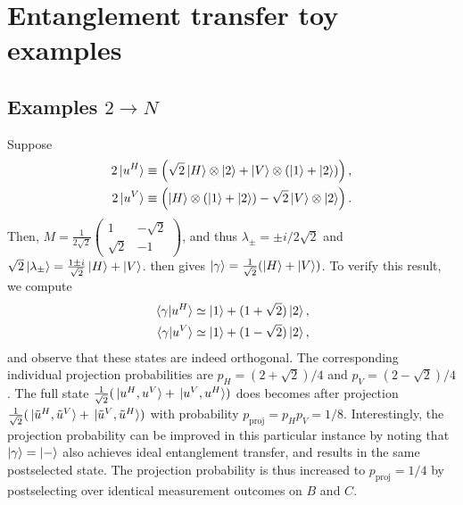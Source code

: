 \documentclass[
aps, pra, authorblock, superscriptaddress, twocolumn,
	10pt]{revtex4-1}
\newcommand{\on}[1]{\operatorname{#1}}
\newcommand{\parTitle}[1]{\noindent{\color{Mahogany}(\emph{#1})}}
\begin{document}
\section{Entanglement transfer toy examples}

\subsection{Examples \texorpdfstring{$2\to N$}{2->N}}
\parTitle{Example 1}
Suppose
\begin{equation}
\begin{aligned}
    2\ket*{u^H} \equiv \left(
        \sqrt2\ket H \otimes\ket2 +
        \ket V \otimes(\ket1 + \ket2)
    \right), \\
    2\ket*{u^V} \equiv \left(
        \ket H\otimes(\ket1 + \ket2) -
        \sqrt2\ket V\otimes \ket2
    \right).
\end{aligned}
\end{equation}
Then,
$M = \frac{1}{2\sqrt2}\begin{pmatrix}1 & -\sqrt2 \\ \sqrt2 & -1 \end{pmatrix}$,
and thus $\lambda_\pm=\pm i/2\sqrt2$ and
$\sqrt2\ket{\lambda_\pm}=\frac{1\pm i}{\sqrt2}\ket H + \ket V$.
 then gives
$\ket\gamma=\frac{1}{\sqrt2}(\ket H + \ket V)$.
To verify this result, we compute
\begin{equation}
\begin{aligned}
    \braket*{\gamma}{u^H} \simeq %
        \ket1 + (1+\sqrt2)\ket2, \\
    \braket*{\gamma}{u^V} \simeq %
        \ket1 + (1-\sqrt2)\ket2,
\end{aligned}
\end{equation}
and observe that these states are indeed orthogonal.
The corresponding individual projection probabilities are
$p_H=(2+\sqrt2)/4$ and $p_V=(2-\sqrt2)/4$.
The full state $\frac{1}{\sqrt2}(\ket*{u^H,u^V}+\ket*{u^V,u^H})$ does becomes after projection
$\frac{1}{\sqrt2}(\ket*{\tilde u^H,\tilde u^V}+\ket*{\tilde u^V,\tilde u^H})$
with probability $p_{\on{proj}} = p_H p_V = 1/8$.
Interestingly, the projection probability can be improved in this particular instance by noting that $\ket\gamma=\ket -$ also achieves ideal entanglement transfer, and results in the same postselected state. The projection probability is thus increased to $p_{\on{proj}}=1/4$ by postselecting over identical measurement outcomes on $B$ and $C$.
\end{document}
